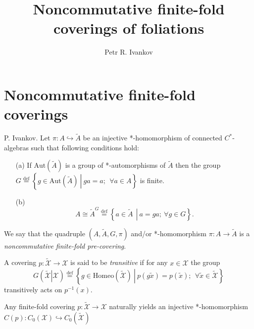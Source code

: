 \documentclass{beamer}
\title{Noncommutative finite-fold coverings of foliations}
\institute
{
Noncommutative geometry and topology
}
\author{Petr R. Ivankov  }
\theoremstyle{plain}
\newcommand{\be}{\begin{equation}}
\newcommand{\ee}{\end{equation}}
\newcommand{\Aut}{\mathrm{Aut}}
\newcommand{\sX}{\mathcal{X}}       %
\newcommand{\bydef}{\stackrel{\mathrm{def}}{=}}
\newcommand{\hookto}{\hookrightarrow}        %
\begin{document}
\begin{frame}
  \titlepage
\end{frame}
	\section{Noncommutative finite-fold coverings}
\begin{frame}
	   \begin{definition}\label{pre_defn} \alert{P. Ivankov}.
		Let $\pi: A \hookto \widetilde{A}$ be an injective *-homomorphism of connected  $C^*$-algebras such that following conditions hold:
		\begin{enumerate}
			\item[(a)] If $\Aut\left(\widetilde{A} \right)$ is a group of *-automorphisms of $\widetilde{A}$ then the group  
			$
			G \bydef \left\{ \left.g \in \Aut\left(\widetilde{A} \right)~\right|~ ga = a;~~\forall a \in A\right\}
			$
			is finite.
			\item[(b)] 	\be\label{cond_b_eqn}
			A \cong \widetilde{A}^G\stackrel{\text{def}}{=}\left\{\left.a\in \widetilde{A}~~\right|~ a = g a;~ \forall g \in G\right\}.\ee
		\end{enumerate}
		We say that the quadruple $\left(A, \widetilde{A}, G, \pi \right)$ and/or *-homomorphism $\pi: A \to \widetilde{A}$   is a \textit{noncommutative finite-fold  pre-covering}. 
	\end{definition}

\end{frame}

\begin{frame}


\begin{definition}
	A covering $ p:\widetilde{\mathcal  X}\to \mathcal  X$ is said to be \textit{transitive} if for any $x \in \mathcal  X$ the group
	$$
	G\left(\left.\widetilde{\mathcal  X} \right|\mathcal  X\right)\bydef \left\{ \left.g \in \text{Homeo}\left(\widetilde{\mathcal X} \right)~\right|~ p(g\widetilde{x}) = p(\widetilde{x});~~\forall \widetilde{x} \in \widetilde{\mathcal  X}\right\} 
	$$
	transitively acts on $p^{-1}\left(x\right)$.
\end{definition}
\begin{fact}
	Any finite-fold covering   $ p:\widetilde{\mathcal  X}\to \mathcal  X$ naturally yields an injective *-homomorphism $C\left( p\right) : C_0\left(\sX \right) \hookto C_0\left( \widetilde{\mathcal  X}\right)$
\end{fact}

\end{frame}
\end{document}
